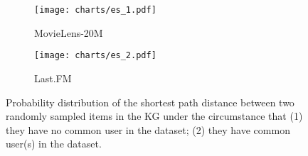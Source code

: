 \documentclass[sigconf]{acmart}
\begin{document}
		
		\begin{figure}[t]
		\centering
        \begin{subfigure}[b]{0.22\textwidth}
            \texttt{[image: charts/es\_1.pdf]}
            \caption{MovieLens-20M}
            \label{fig:es_1}
        \end{subfigure}
        \hfill
        \begin{subfigure}[b]{0.22\textwidth}
            \texttt{[image: charts/es\_2.pdf]}
            \caption{Last.FM}
            \label{fig:es_2}
        \end{subfigure}
        \caption{Probability distribution of the shortest path distance between two randomly sampled items in the KG under the circumstance that (1) they have no common user in the dataset; (2) they have common user(s) in the dataset.}
        \label{fig:es}
    	\end{figure}
    	
\end{document}
